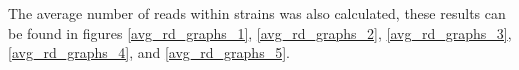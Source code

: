 \documentclass[../main.tex]{subfiles}
\begin{document}
The average number of reads within strains was also calculated, these results can be found in figures \ref{avg_rd_graphs_1}, \ref{avg_rd_graphs_2}, \ref{avg_rd_graphs_3}, \ref{avg_rd_graphs_4}, and \ref{avg_rd_graphs_5}. 

\begin{figure}[H]
	\begin{centering}
		\vspace{-1.5cm}
		\\

\end{centering}
\end{figure}
\end{document}
